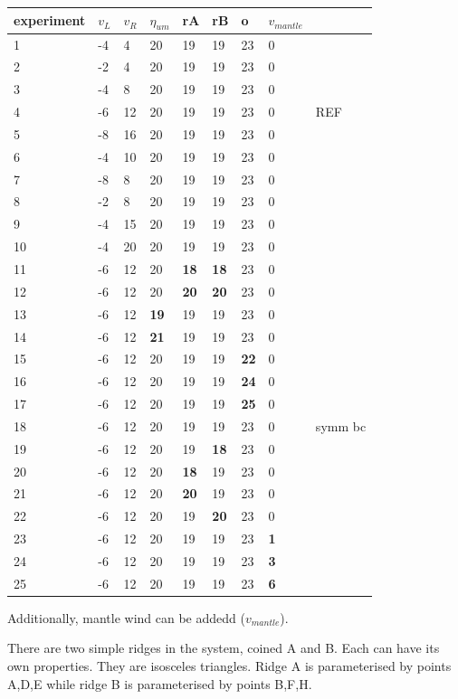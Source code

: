 \begin{tabular}{lllllllll}
\hline
experiment & $v_L$ & $v_R$ & $\eta_{um}$ &rA &rB &o & $v_{mantle}$\\ 
\hline
\hline
1 & -4 &  4& 20&19&19&23&0\\
2 & -2 &  4& 20&19&19&23&0\\
3 & -4 &  8& 20&19&19&23&0\\
4 & -6 & 12& 20&19&19&23&0 & REF\\
5 & -8 & 16& 20&19&19&23&0\\
6 & -4 & 10& 20&19&19&23&0\\
7 & -8 &  8& 20&19&19&23&0\\
8 & -2 &  8& 20&19&19&23&0\\
9 & -4 & 15& 20&19&19&23&0\\
10& -4 & 20& 20&19&19&23&0\\
11& -6 & 12& 20       & {\bf 18} &  {\bf 18} & 23&0 & \\ 
12& -6 & 12& 20       & {\bf 20} &  {\bf 20} & 23&0 & \\ 
13& -6 & 12& {\bf 19} & 19       & 19        & 23&0\\
14& -6 & 12& {\bf 21} & 19       & 19        & 23&0\\
15& -6 & 12& 20       & 19       & 19        & {\bf 22}&0\\
16& -6 & 12& 20       & 19       & 19        & {\bf 24}&0\\
17& -6 & 12& 20       & 19       & 19        & {\bf 25}&0\\
18& -6 & 12& 20       & 19       & 19        & 23&0 & symm bc\\
19& -6 & 12& 20       & 19       & {\bf 18}  & 23&0&\\
20& -6 & 12& 20       & {\bf 18} & 19        & 23&0&\\
21& -6 & 12& 20       & {\bf 20} & 19        & 23&0&\\
22& -6 & 12& 20       &  19      & {\bf 20}  & 23&0&\\
23& -6 & 12& 20&19&19&23& {\bf 1} & \\
24& -6 & 12& 20&19&19&23& {\bf 3} & \\
25& -6 & 12& 20&19&19&23& {\bf 6} & \\
\hline
\end{tabular}

Additionally, mantle wind can be addedd ($v_{mantle}$). 

There are two simple ridges in the system, coined A and B. Each can have its own properties.
They are isosceles triangles. Ridge A is parameterised by points A,D,E while 
ridge B is parameterised by points B,F,H.

